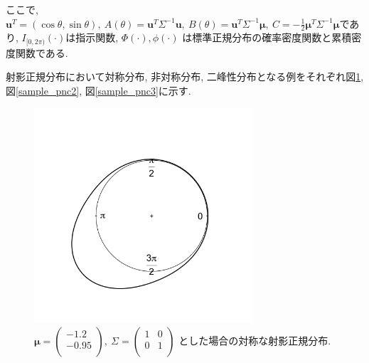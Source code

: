 \documentclass[a4j,12pt]{jarticle}
\begin{document}
\noindent
ここで, $\bm u^T = (\cos\theta,\sin\theta), \ A(\theta) = \bm u^T\Sigma^{-1}\bm u, \ B(\theta) = \bm u^T \Sigma^{-1} \bm \mu, \ C = -\frac{1}{2} \bm \mu^T \Sigma^{-1} \bm \mu$であり, $I_{[0,2\pi)} (\cdot)$は指示関数, $\Phi(\cdot), \phi(\cdot)$ は標準正規分布の確率密度関数と累積密度関数である.

射影正規分布において対称分布, 非対称分布, 二峰性分布となる例をそれぞれ図\ref{sample_pnc1}, 図\ref{sample_pnc2}, 図\ref{sample_pnc3}に示す. 

\begin{figure}[tbp]
\begin{center}
\includegraphics[clip,height= 80mm]{data/sample_symmetry.png}
\caption[対称な射影正規分布]{
$\bm \mu = \begin{pmatrix} -1.2 \\ -0.95 \\ \end{pmatrix}, \ \Sigma = \begin{pmatrix}  1 & 0 \\ 0 & 1 \\ \end{pmatrix}$
とした場合の対称な射影正規分布.}
\label{sample_pnc1}
\end{center}
\end{figure}
\end{document}
